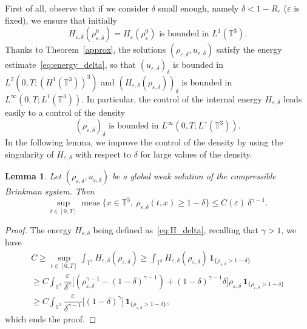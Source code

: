\documentclass[10pt]{amsart}
\newcommand{\<}{\bigl\langle}
\renewcommand{\>}{\bigr\rangle}
\DeclareMathOperator{\meas}{meas}
\newcommand{\labeleq}[1]{}
\newtheorem{lem}[thm]{Lemma}
\theoremstyle{definition}
\theoremstyle{remark}
\newcommand{\TT}{\mathbb{T}^3}
\let\ep\varepsilon
\begin{document}
First of all, observe that if we consider $\delta$ small enough, namely $\delta < 1-R_\ep$ ($\ep$ is fixed), we ensure that initially
\[
H_{\ep,\delta}(\rho_{\ep,\delta}^0) = H_{\ep}(\rho_{\ep}^0) \text{ is bounded in } L^1(\TT).
\]
Thanks to Theorem~\ref{approx}, the solutions $(\rho_{\ep,\delta},u_{\ep,\delta})$ satisfy the energy estimate~\eqref{eq:energy_delta}, so that $(u_{\ep,\delta})_\delta$ is bounded in $L^2(0,T;(H^1(\TT))^3)$
and $(H_{\ep,\delta}(\rho_{\ep,\delta}))_\delta$ is bounded in $L^\infty(0,T;L^1(\TT))$.
In particular, the control of the internal energy $H_{\ep,\delta}$ leads easily to a control of the density\vspace*{-3pt}
\begin{equation*}\labeleq{bound-rd-Lgamma}
(\rho_{\ep,\delta})_\delta \text{ is bounded in } L^{\infty}(0,T;L^\gamma(\TT)).
\end{equation*}
In the following lemma, we improve the control of the density by using the singularity of $H_{\ep,\delta}$ with respect to $\delta$ for large values of the density.
\begin{lem}\label{lem:meas_largerho_delta}
Let $(\rho_{\varepsilon, \delta}, u_{\varepsilon,\delta})$ be a global weak solution
of the compressible Brinkman system. Then\vspace*{-3pt}
\begin{equation}\label{eq:est-rhodelta}
\sup_{t\in [0,T]} \meas \big\{ x\in \TT, \ \rho_{\ep,\delta}(t,x) \geq 1-\delta \big\} \leq C(\ep) \ \delta^{\gamma -1}.
\end{equation}
\end{lem}

\begin{proof} The energy $H_{\ep,\delta}$ being defined as~\eqref{eq:H_delta}, recalling that $\gamma>1$, we have\vspace*{-3pt}
\begin{multline} \label{eq:ineg-Hdelta}
C \geq \sup_{t\in [0,T]} \int_{\TT}{H_{\ep,\delta}(\rho_{\ep,\delta})}
\geq \int_{\TT}{H_{\ep,\delta}(\rho_{\ep,\delta}) \,\mathbf{1}_{\{ \rho_{\ep,\delta} > 1-\delta \}}} \\[-2pt]
\geq C\int_{\TT}{\dfrac{\ep}{\delta^\gamma}\bigl[
(\rho_{\varepsilon,\delta}^{\gamma-1} - (1-\delta)^{\gamma-1})
+ (1-\delta)^{\gamma-1}\delta \bigr] \rho_{\ep,\delta}
\,\mathbf{1}_{\{ \rho_{\ep,\delta} > 1-\delta \}}} \\[-3pt]
\geq C\int_{\TT}{\dfrac{\ep}{\delta^{\gamma-1} }\bigl[
(1-\delta)^{\gamma} \bigr]
\,\mathbf{1}_{\{ \rho_{\ep,\delta} > 1-\delta \}}},
\end{multline}
which ends the proof.
\end{proof}
\end{document}
